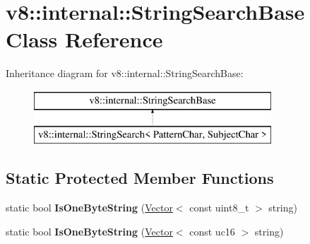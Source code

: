 \hypertarget{classv8_1_1internal_1_1_string_search_base}{}\section{v8\+:\+:internal\+:\+:String\+Search\+Base Class Reference}
\label{classv8_1_1internal_1_1_string_search_base}
Inheritance diagram for v8\+:\+:internal\+:\+:String\+Search\+Base\+:\begin{figure}[H]
\begin{center}
\leavevmode
\includegraphics[height=2.000000cm]{classv8_1_1internal_1_1_string_search_base}
\end{center}
\end{figure}
\subsection*{Static Protected Member Functions}
\begin{DoxyCompactItemize}
\item 
\hypertarget{classv8_1_1internal_1_1_string_search_base_afd945987a48941b841edfd8e6f5c47a8}{}static bool {\bfseries Is\+One\+Byte\+String} (\hyperlink{classv8_1_1internal_1_1_vector}{Vector}$<$ const uint8\+\_\+t $>$ string)\label{classv8_1_1internal_1_1_string_search_base_afd945987a48941b841edfd8e6f5c47a8}

\item 
\hypertarget{classv8_1_1internal_1_1_string_search_base_afe268149123840e06458df33d10bfafc}{}static bool {\bfseries Is\+One\+Byte\+String} (\hyperlink{classv8_1_1internal_1_1_vector}{Vector}$<$ const uc16 $>$ string)\label{classv8_1_1internal_1_1_string_search_base_afe268149123840e06458df33d10bfafc}

\end{DoxyCompactItemize}

